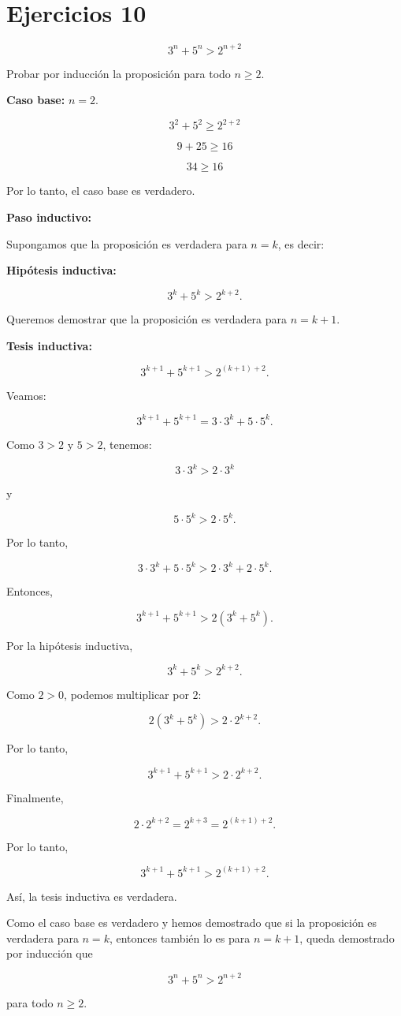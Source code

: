 \section{Ejercicios 10}

\begin{ejercicio}
\[
3^n+5^n>2^{n+2}
\]

Probar por inducción la proposición para todo $n\geq2$.

\textbf{Caso base:} $n=2$.

\[
3^2+5^2\geq2^{2+2}
\]

\[
9+25\geq16
\]

\[
34\geq16
\]

Por lo tanto, el caso base es verdadero.

\textbf{Paso inductivo:}

Supongamos que la proposición es verdadera para $n=k$, es decir:

\textbf{Hipótesis inductiva:}

\[
3^k+5^k>2^{k+2}.
\]

Queremos demostrar que la proposición es verdadera para $n=k+1$.

\textbf{Tesis inductiva:}

\[
3^{k+1}+5^{k+1}>2^{(k+1)+2}.
\]

Veamos:

\[
3^{k+1}+5^{k+1}
=
3\cdot3^k+5\cdot5^k.
\]

Como $3>2$ y $5>2$, tenemos:

\[
3\cdot3^k>2\cdot3^k
\]

y

\[
5\cdot5^k>2\cdot5^k.
\]

Por lo tanto,

\[
3\cdot3^k+5\cdot5^k
>
2\cdot3^k+2\cdot5^k.
\]

Entonces,

\[
3^{k+1}+5^{k+1}
>
2(3^k+5^k).
\]

Por la hipótesis inductiva,

\[
3^k+5^k>2^{k+2}.
\]

Como $2>0$, podemos multiplicar por $2$:

\[
2(3^k+5^k)>2\cdot2^{k+2}.
\]

Por lo tanto,

\[
3^{k+1}+5^{k+1}
>
2\cdot2^{k+2}.
\]

Finalmente,

\[
2\cdot2^{k+2}=2^{k+3}=2^{(k+1)+2}.
\]

Por lo tanto,

\[
3^{k+1}+5^{k+1}>2^{(k+1)+2}.
\]

Así, la tesis inductiva es verdadera.

Como el caso base es verdadero y hemos demostrado que si la proposición es verdadera para $n=k$, entonces también lo es para $n=k+1$, queda demostrado por inducción que

\[
\boxed{3^n+5^n>2^{n+2}}
\]

para todo $n\geq2$.
\end{ejercicio}

